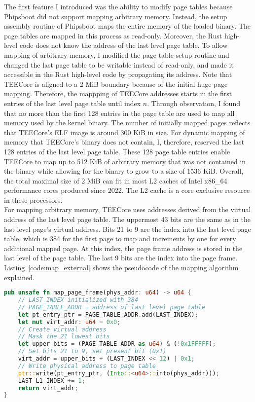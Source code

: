 The first feature I introduced was the ability to modify page tables because
Phipsboot did not support mapping arbitrary memory. Instead, the setup assembly
routine of Phipsboot maps the entire memory of the loaded binary. The page
tables are mapped in this process as read-only. Moreover, the Rust high-level
code does not know the address of the last level page table. To allow mapping of
arbitrary memory, I modified the page table setup routine and changed the last
page table to be writable instead of read-only, and made it accessible in the
Rust high-level code by propagating its address. Note that TEECore is aligned to
a 2 MiB boundary because of the initial huge page mapping. Therefore, the
mappping of TEECore addresses starts in the first entries of the last level page
table until index $n$. Through observation, I found that no more than the first
128 entries in the page table are used to map all memory used by the kernel
binary. The number of initially mapped pages reflects that TEECore's ELF image
is around 300 KiB in size. For dynamic mapping of memory that TEECore's binary
does not contain, I, therefore, reserved the last 128 entries of the last level
page table. These 128 page table entries enable  TEECore to map up to 512 KiB of
arbitrary memory that was not contained in the binary while allowing for the
binary to grow to a size of 1536 KiB. Overall, the total maximal size of 2 MiB
can fit in most L2 caches of Intel x86\_64 performance cores produced since
2022. The L2 cache is a core exclusive resource in these processors.\\

For mapping arbitrary memory, TEECore uses addresses derived from the virtual
address of the last level page table. The uppermost 43 bits are the same as in
the last level page's virtual address. Bits 21 to 9 are the index into the last
level page table, which is 384 for the first page to map and increments by one
for every additional mapped page. At this index, the page frame address is
stored in the last level of the page table. The last 9 bits are the index into
the page frame. Listing~\ref{code:map_external} shows the pseudocode of the
mapping algorithm explained.

\begin{lstlisting}[language=Rust, caption=Mapping of external memory, label=code:map_external]
pub unsafe fn map_page_frame(phys_addr: u64) -> u64 {
    // LAST_INDEX initialized with 384
    // PAGE_TABLE_ADDR = address of last level page table
    let pt_entry_ptr = PAGE_TABLE_ADDR.add(LAST_INDEX);
    let mut virt_addr: u64 = 0x0;
    // Create virtual address
    // Mask the 21 lowest bits
    let upper_bits = (PAGE_TABLE_ADDR as u64) & (!0x1FFFFF);
    // Set bits 21 to 9, set present bit (0x1)
    virt_addr = upper_bits + (LAST_INDEX << 12) | 0x1;
    // Write physical address to page table
    ptr::write(pt_entry_ptr, (Into::<u64>::into(phys_addr)));
    LAST_L1_INDEX += 1;
    return virt_addr;
}
\end{lstlisting}

